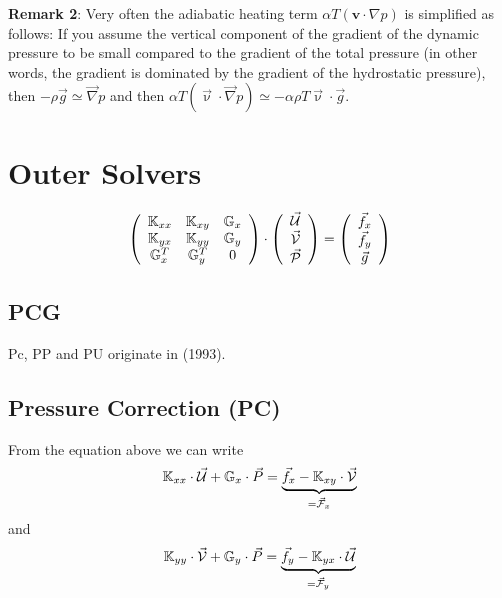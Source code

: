 \documentclass[a4paper,12pt]{article}
\begin{document}
{\bf Remark 2}: Very often the adiabatic heating term  
$\alpha T \left( \bm v \cdot \nabla p \right)$ is simplified as follows:
If you assume the vertical component of the gradient of the dynamic pressure to be small compared to the
gradient of the total pressure (in other words, the gradient is dominated by the gradient of the hydrostatic
pressure), then $-\rho {\vec g} \simeq {\vec \nabla}p$ and then 
$\alpha T \left( \vec\upnu \cdot \vec\nabla p \right) \simeq  
-\alpha\rho T {\vec\upnu}\cdot{\vec g}$. 





\newpage
\section{Outer Solvers}


\[
\left(
\begin{array}{ccc}
{\mathbb{K}}_{xx} & {\mathbb{K}}_{xy} & {\mathbb{G}}_x \\
{\mathbb{K}}_{yx} & {\mathbb{K}}_{yy} & {\mathbb{G}}_y \\
{\mathbb{G}}_x^T & {\mathbb{G}}_y^T & 0 
\end{array}
\right)
\cdot
\left(
\begin{array}{c}
\vec{\cal U} \\ \vec{\cal V} \\ \vec{\cal P}
\end{array}
\right)
=
\left(
\begin{array}{c}
\vec{f}_x \\ \vec{f}_y \\ \vec{g}
\end{array}
\right)
\]


\subsection{PCG}

Pc, PP and PU originate in \textcite{haeh93} (1993).

\subsection{Pressure Correction (PC)}

From the equation above we can write
\[
{\mathbb{K}}_{xx}\cdot\vec{\cal U} + {\mathbb{G}}_x \cdot \vec{P} 
= \underbrace{\vec{f}_x - {\mathbb{K}}_{xy} \cdot \vec{\cal V}}_{= \vec{\cal F}_x} 
\]
and
\[
{\mathbb{K}}_{yy}\cdot\vec{\cal V} + {\mathbb{G}}_y \cdot \vec{P} 
= \underbrace{\vec{f}_y - {\mathbb{K}}_{yx} \cdot \vec{\cal U}}_{= \vec{\cal F}_y} 
\]
\end{document}
